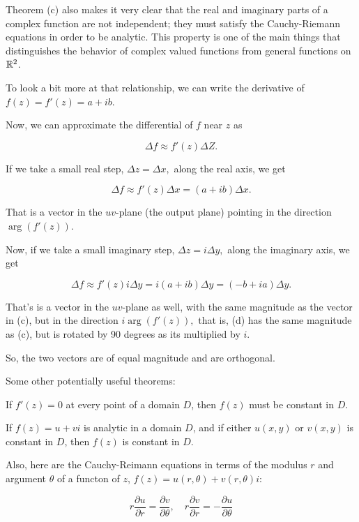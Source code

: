 \documentclass{article}
\begin{document}
\begin{intuition}
Theorem (c) also makes it very clear that the real and imaginary parts of a complex function are not independent; they must satisfy the Cauchy-Riemann equations in order to be \@{analytic}. This property is one of the main things that distinguishes the behavior of complex valued functions from general functions on $\mathbb{R}^2$.

To look a bit more at that relationship, we can write the derivative of $f(z) = f'(z) = a + ib.$

Now, we can approximate the \@{differential} of $f$ near $z$ as

\[ \Delta f \approx  f'(z) \Delta Z. \]

If we take a small real step, $\Delta z = \Delta x,$ along the real axis, we get

\[ \Delta f \approx f'(z) \Delta x = (a + ib) \Delta x. \tag{c} \]

That is a \@{vector} in the $uv$-plane (the output plane) pointing in the direction $\arg(f'(z)).$

Now, if we take a small imaginary step, $\Delta z = i\Delta y,$ along the imaginary axis, we get

\[ \Delta f \approx f'(z) i \Delta y = i(a + ib) \Delta y = (-b + ia) \Delta y. \tag{d} \]

That's is a \@{vector} in the $uv$-plane as well, with the same \@{magnitude} as the vector in (c), but in the direction $i \arg(f'(z)),$ that is, (d) has the same magnitude as (c), but is rotated by 90 degrees as its multiplied by $i.$

So, the two vectors are of equal magnitude and are \@{orthogonal}.
\end{intuition}


Some other potentially useful theorems:

If $f'(z) = 0$ at every point of a \@{domain} $D$, then $f(z)$ must be constant in $D$.

If $f(z) = u + vi$ is \@{analytic} in a domain $D$, and if either $u(x,y)$ or $v(x,y)$ is constant in $D$, then $f(z)$ is constant in $D$.

Also, here are the Cauchy-Reimann equations in terms of the modulus $r$ and argument $\theta$ of a functon of $z$, $f(z) = u(r,\theta) + v(r,\theta)i$:

\[ r \frac{\partial u}{\partial r} = \frac{\partial v}{\partial \theta}, \quad r\frac{\partial v}{\partial r} = -\frac{\partial u}{\partial \theta} \]
\end{document}
